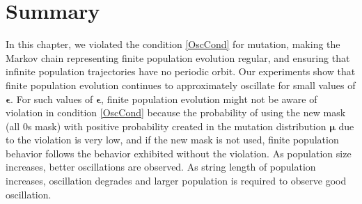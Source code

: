 \section{Summary}
In this chapter, we violated the condition \ref{OscCond} for mutation, making 
the Markov chain representing finite population evolution regular,
and ensuring that infinite population trajectories 
have no periodic orbit. Our experiments show that finite population evolution 
continues to approximately oscillate for small values of $\bm{\epsilon}$. 
For such values of $\bm{\epsilon}$, finite population evolution might not be 
aware of violation in condition \ref{OscCond} because the probability of using 
the new mask (all 0s mask) with positive probability created 
in the mutation distribution $\bm{\mu}$ due to the violation is very low, and 
if the new mask is not used, finite population behavior 
follows the behavior exhibited without the violation. 
As population size increases, better oscillations are observed. 
As string length of population increases, oscillation degrades 
and larger population is required to observe good oscillation. 




 
